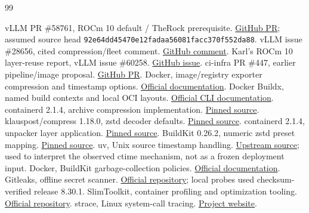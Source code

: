 \documentclass[11pt,a4paper]{article}
\newcommand{\file}[1]{\nolinkurl{#1}}
\begin{document}
\clearpage
\begin{thebibliography}{99}
 vLLM PR \#58761, ROCm 10 default / TheRock prerequisite.
\href{https://github.com/vllm-project/vllm/pull/58761}{GitHub PR}; assumed source
head \file{92e64dd45470e12fadaa56081facc370f552da88}.
 vLLM issue \#28656, cited compression/fleet comment.
\href{https://github.com/vllm-project/vllm/issues/28656\#issuecomment-5960837570}{GitHub comment}.
 Karl's ROCm 10 layer-reuse report, vLLM issue \#60258.
\href{https://github.com/vllm-project/vllm/issues/60258}{GitHub issue}.
 ci-infra PR \#447, earlier pipeline/image proposal.
\href{https://github.com/vllm-project/ci-infra/pull/447}{GitHub PR}.
 Docker, image/registry exporter compression and timestamp
options. \href{https://docs.docker.com/build/exporters/image-registry/}{Official documentation}.
 Docker Buildx, named build contexts and local OCI layouts.
\href{https://docs.docker.com/reference/cli/docker/buildx/build/\#build-context}{Official CLI documentation}.
 containerd 2.1.4, archive compression implementation.
\href{https://github.com/containerd/containerd/blob/v2.1.4/pkg/archive/compression/compression.go}{Pinned source}.
 klauspost/compress 1.18.0, zstd decoder defaults.
\href{https://github.com/klauspost/compress/blob/v1.18.0/zstd/decoder_options.go}{Pinned source}.
 containerd 2.1.4, unpacker layer application.
\href{https://github.com/containerd/containerd/blob/v2.1.4/core/unpack/unpacker.go}{Pinned source}.
 BuildKit 0.26.2, numeric zstd preset mapping.
\href{https://github.com/moby/buildkit/blob/v0.26.2/util/compression/zstd.go}{Pinned source}.
 uv, Unix source timestamp handling.
\href{https://github.com/astral-sh/uv/blob/main/crates/uv-cache-info/src/timestamp.rs}{Upstream source};
used to interpret the observed ctime mechanism, not as a frozen deployment input.
 Docker, BuildKit garbage-collection policies.
\href{https://docs.docker.com/build/cache/garbage-collection/}{Official documentation}.
 Gitleaks, offline secret scanner.
\href{https://github.com/gitleaks/gitleaks}{Official repository}; local probes
used checksum-verified release 8.30.1.
 SlimToolkit, container profiling and optimization tooling.
\href{https://github.com/slimtoolkit/slim}{Official repository}.
 strace, Linux system-call tracing.
\href{https://strace.io/}{Project website}.
\end{thebibliography}
\end{document}
